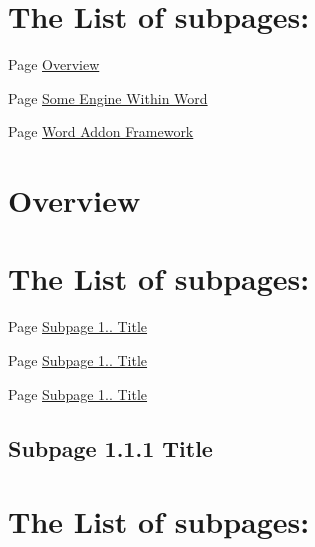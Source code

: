 \section*{The List of subpages\+:}


\begin{DoxyItemize}
\item Page \hyperlink{subpage_1_1}{Overview}
\item Page \hyperlink{subpage_1_2}{Some Engine Within Word}
\item Page \hyperlink{subpage_1_3}{Word Addon Framework} 
\end{DoxyItemize}\hypertarget{subpage_1_1}{}\section{Overview}\label{subpage_1_1}
\section*{The List of subpages\+:}


\begin{DoxyItemize}
\item Page \hyperlink{subpage_1_1_1}{Subpage 1.. Title}
\item Page \hyperlink{subpage_1_1_2}{Subpage 1.. Title}
\item Page \hyperlink{subpage_1_1_3}{Subpage 1.. Title} 
\end{DoxyItemize}\hypertarget{subpage_1_1_1}{}\subsection{Subpage 1.1.1 Title}\label{subpage_1_1_1}
\section*{The List of subpages\+:}


